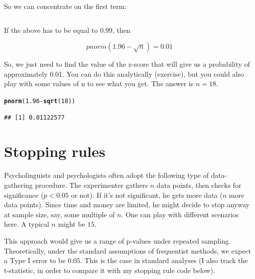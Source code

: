 \documentclass[12pt]{book}\usepackage[]{graphicx}\usepackage[]{color}
\makeatletter
\newcommand{\hlnum}[1]{\textcolor[rgb]{0.686,0.059,0.569}{#1}}%
\newcommand{\hlopt}[1]{\textcolor[rgb]{0,0,0}{#1}}%
\newcommand{\hlstd}[1]{\textcolor[rgb]{0.345,0.345,0.345}{#1}}%
\newcommand{\hlkwd}[1]{\textcolor[rgb]{0.737,0.353,0.396}{\textbf{#1}}}%
\newenvironment{kframe}{%
 \def\at@end@of@kframe{}%
 \ifinner\ifhmode%
  \def\at@end@of@kframe{\end{minipage}}%
  \begin{minipage}{\columnwidth}%
 \fi\fi%
 \def\FrameCommand##1{\hskip\@totalleftmargin \hskip-\fboxsep
 \colorbox{shadecolor}{##1}\hskip-\fboxsep
     \hskip-\linewidth \hskip-\@totalleftmargin \hskip\columnwidth}%
 \MakeFramed {\advance\hsize-\width
   \@totalleftmargin\z@ \linewidth\hsize
   \@setminipage}}%
 {\par\unskip\endMakeFramed%
 \at@end@of@kframe}
\newenvironment{knitrout}{}{} %
\makeatother
\begin{document}
So we can concentrate on the first term:

\begin{equation}
[1 - pnorm(1.96 - \sqrt{n})]
\end{equation}

If the above has to be equal to $0.99$, then 

\begin{equation}
pnorm(1.96 - \sqrt{n})=0.01
\end{equation}

So, we just need to find the value of the z-score that will give us a probability of approximately 0.01. You can do this analytically (exercise), but you could also play with some values of n to see what you get. The answer is $n=18$.

\begin{knitrout}
\color{fgcolor}\begin{kframe}
\begin{alltt}
\hlkwd{pnorm}\hlstd{(}\hlnum{1.96}\hlopt{-}\hlkwd{sqrt}\hlstd{(}\hlnum{18}\hlstd{))}
\end{alltt}
\begin{verbatim}
## [1] 0.01122577
\end{verbatim}
\end{kframe}
\end{knitrout}

\section{Stopping rules}

Psycholinguists and psychologists often adopt the following type of data-gathering procedure.
The experimenter gathers $n$ data points, then checks for significance ($p<0.05$ or not). If it's not significant, he gets more data ($n$ more data points). Since time and money are limited, he might decide to stop anyway at sample size, say, some multiple of $n$. 
One can play with different scenarios here. A typical $n$ might be $15$.

This approach would give us a range of p-values under repeated sampling. Theoretically, under the standard assumptions of frequentist methods, we expect a Type I error to be $0.05$. This is the case in standard analyses (I also track the t-statistic, in order to compare it with my stopping rule code below).
\end{document}
